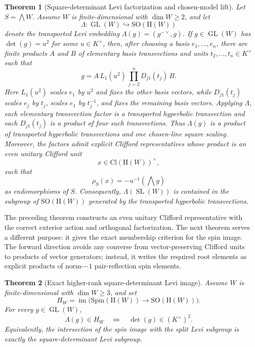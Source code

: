 \documentclass{birkjour}
\theoremstyle{plain}
\newtheorem{theorem}{Theorem}[section]
\theoremstyle{definition}
\theoremstyle{remark}
\numberwithin{equation}{section}
\newcommand{\Cl}{\mathrm{Cl}}
\newcommand{\Spin}{\mathrm{Spin}}
\newcommand{\SO}{\mathrm{SO}}
\newcommand{\Hyp}{\mathrm{H}}
\begin{document}
\begin{theorem}[Square-determinant Levi factorization and chosen-model lift]
\label{thm:square-det-levi}
Let $S=\bigwedge W$. Assume \(W\) is finite-dimensional with $\dim W\ge 2$, and let
\[
  \Lambda:\operatorname{GL}(W)\hookrightarrow \SO(\Hyp(W))
\]
denote the transported Levi embedding $\Lambda(g)=(g^{-{\vee}},g)$. If
$g\in \operatorname{GL}(W)$ has $\det(g)=u^2$ for some $u\in K^\times$, then,
after choosing a basis \(e_1,\ldots,e_n\), there are finite products \(A\) and
\(B\) of elementary basis transvections and units \(t_2,\ldots,t_n\in K^\times\)
such that
\[
  g=A\,L_1(u^2)\,\prod_{j=2}^{n}D_{j1}(t_j)\,B.
\]
Here \(L_1(u^2)\) scales \(e_1\) by \(u^2\) and fixes the other basis vectors,
while \(D_{j1}(t_j)\) scales \(e_j\) by \(t_j\), scales \(e_1\) by \(t_j^{-1}\),
and fixes the remaining basis vectors. Applying \(\Lambda\), each elementary
transvection factor is a transported hyperbolic transvection and each
\(D_{j1}(t_j)\) is a product of four such transvections. Thus \(\Lambda(g)\) is a
product of transported hyperbolic transvections and one chosen-line square
scaling. Moreover, the factors admit explicit Clifford representatives whose
product is an even unitary Clifford unit
\[
  x\in \Cl(\Hyp(W))^\times,
\]
such that
\[
  \rho_S(x)=-u^{-1}(\bigwedge g)
\]
as endomorphisms of $S$. Consequently, $\Lambda(\operatorname{SL}(W))$ is
contained in the subgroup of
$\SO(\Hyp(W))$ generated by the transported hyperbolic transvections.
\end{theorem}

The preceding theorem constructs an
even unitary Clifford representative with the correct exterior action and
orthogonal factorization. The next theorem serves a different purpose: it gives the
exact membership criterion for the spin image. The forward direction avoids any converse from
vector-preserving Clifford units to products of vector generators; instead, it
writes the required root elements as explicit products of norm-\(-1\)
pair-reflection spin elements.

\begin{theorem}[Exact higher-rank square-determinant Levi image]
\label{thm:square-det-levi-image}
Assume \(W\) is finite-dimensional with $\dim W\ge 3$, and set
\[
  H_W=\operatorname{im}\bigl(\Spin(\Hyp(W))\to\SO(\Hyp(W))\bigr).
\]
For every \(g\in\operatorname{GL}(W)\),
\[
  \Lambda(g)\in H_W
  \quad\Longleftrightarrow\quad
  \det(g)\in (K^\times)^2.
\]
Equivalently, the intersection of the spin image with the split Levi subgroup is
exactly the square-determinant Levi subgroup.
\end{theorem}
\end{document}
